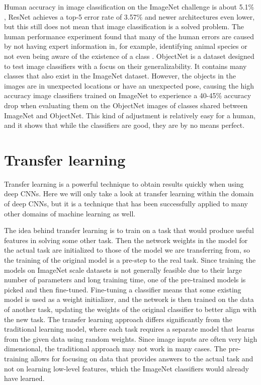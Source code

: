 Human accuracy in image classification on the ImageNet challenge is about 5.1\% \citep{imageNet_summary}, ResNet achieves a top-5 error rate of 3.57\% \citep{resNet} and newer architectures even lower, but this still does not mean that image classification is a solved problem. The human performance experiment found that many of the human errors are caused by not having expert information in, for example, identifying animal species or not even being aware of the existence of a class \citep{imageNet_summary}. ObjectNet \citep{objectNet} is a dataset designed to test image classifiers with a focus on their generalizability. It contains many classes that also exist in the ImageNet dataset. However, the objects in the images are in unexpected locations or have an unexpected pose, causing the high accuracy image classifiers trained on ImageNet to experience a 40-45\% accuracy drop when evaluating them on the ObjectNet images of classes shared between ImageNet and ObjectNet. This kind of adjustment is relatively easy for a human, and it shows that while the classifiers are good, they are by no means perfect.

\section{Transfer learning}
Transfer learning is a powerful technique to obtain results quickly when using deep CNNs. Here we will only take a look at transfer learning within the domain of deep CNNs, but it is a technique that has been successfully applied to many other domains of machine learning as well.

The idea behind transfer learning is to train on a task that would produce useful features in solving some other task. 
Then the network weights in the model for the actual task are initialized to those of the model we are transferring from, so the training of the original model is a pre-step to the real task. 
Since training the models on ImageNet scale datasets is not generally feasible due to their large number of parameters and long training time, one of the pre-trained models is picked and then fine-tuned. 
Fine-tuning a classifier means that some existing model is used as a weight initializer, and the network is then trained on the data of another task, updating the weights of the original classifier to better align with the new task. 
The transfer learning approach differs significantly from the traditional learning model, where each task requires a separate model that learns from the given data using random weights. 
Since image inputs are often very high dimensional, the traditional approach may not work in many cases. 
The pre-training allows for focusing on data that provides answers to the actual task and not on learning low-level features, which the ImageNet classifiers would already have learned.

